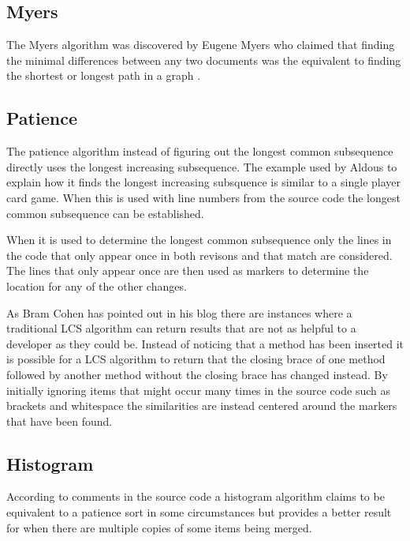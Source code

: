\subsection{Myers}
The Myers algorithm was discovered by Eugene Myers who claimed that finding the minimal differences between any two documents was the equivalent to finding the shortest or longest path in a graph \cite{Myers1986}.


\subsection{Patience}
The patience algorithm instead of figuring out the longest common subsequence directly uses the longest increasing subsequence. 
The example used by Aldous \cite{Aldous1999} to explain how it finds the longest increasing subsquence is similar to a single player card game. 
When this is used with line numbers from the source code the longest common subsequence can be established.

When it is used to determine the longest common subsequence only the lines in the code that only appear once in both revisons and that match are considered. 
The lines that only appear once are then used as markers to determine the location for any of the other changes. 

As Bram Cohen has pointed out in his blog there are instances where a traditional LCS algorithm can return results that are not as helpful to a developer as they could be.  Instead of noticing that a method has been inserted it is possible for a LCS algorithm to return that the closing brace of one method followed by another method without the closing brace has changed instead. By initially ignoring items that might occur many times in the source code such as brackets and whitespace the similarities are instead centered around the markers that have been found. 

% 
% 

\subsection{Histogram}
According to comments in the source code a histogram algorithm claims to be equivalent to a patience sort in some circumstances but provides a better result for when there are multiple copies of some items being merged. 


